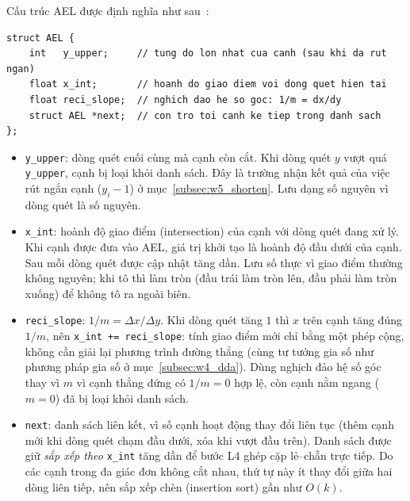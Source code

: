 Cấu trúc AEL được định nghĩa như sau~\citep{dhmt_lec7}:
\begin{verbatim}
struct AEL {
    int   y_upper;     // tung do lon nhat cua canh (sau khi da rut ngan)
    float x_int;       // hoanh do giao diem voi dong quet hien tai
    float reci_slope;  // nghich dao he so goc: 1/m = dx/dy
    struct AEL *next;  // con tro toi canh ke tiep trong danh sach
};
\end{verbatim}
\begin{itemize}
    \item \texttt{y\_upper}: dòng quét cuối cùng mà cạnh còn cắt. Khi dòng quét $y$ vượt quá \texttt{y\_upper}, cạnh bị loại khỏi danh sách. Đây là trường nhận kết quả của việc rút ngắn cạnh ($y_i - 1$) ở mục~\ref{subsec:w5_shorten}. Lưu dạng số nguyên vì dòng quét là số nguyên.
    \item \texttt{x\_int}: hoành độ giao điểm (intersection) của cạnh với dòng quét đang xử lý. Khi cạnh được đưa vào AEL, giá trị khởi tạo là hoành độ đầu dưới của cạnh. Sau mỗi dòng quét được cập nhật tăng dần. Lưu số thực vì giao điểm thường không nguyên; khi tô thì làm tròn (đầu trái làm tròn lên, đầu phải làm tròn xuống) để không tô ra ngoài biên.
    \item \texttt{reci\_slope}: $1/m = \Delta x / \Delta y$. Khi dòng quét tăng $1$ thì $x$ trên cạnh tăng đúng $1/m$, nên \texttt{x\_int += reci\_slope}: tính giao điểm mới chỉ bằng một phép cộng, không cần giải lại phương trình đường thẳng (cùng tư tưởng gia số như phương pháp gia số ở mục~\ref{subsec:w4_dda}). Dùng nghịch đảo hệ số góc thay vì $m$ vì cạnh thẳng đứng có $1/m = 0$ hợp lệ, còn cạnh nằm ngang ($m = 0$) đã bị loại khỏi danh sách.
    \item \texttt{next}: danh sách liên kết, vì số cạnh hoạt động thay đổi liên tục (thêm cạnh mới khi dòng quét chạm đầu dưới, xóa khi vượt đầu trên). Danh sách được giữ \emph{sắp xếp theo} \texttt{x\_int} tăng dần để bước L4 ghép cặp lẻ--chẵn trực tiếp. Do các cạnh trong đa giác đơn không cắt nhau, thứ tự này ít thay đổi giữa hai dòng liên tiếp, nên sắp xếp chèn (insertion sort) gần như $O(k)$.
\end{itemize}

